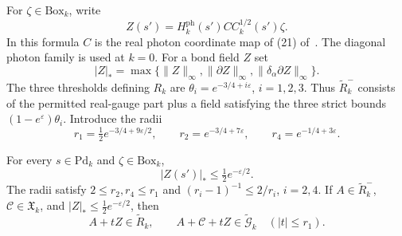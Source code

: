 \documentclass[11pt,letterpaper,reqno]{amsart}
\newcommand{\exteq}[2]{(#1) of~\cite{#2}}
\begin{document}
For $\zeta\in\mathrm{Box}_k$, write
\begin{equation}\label{eq:rgnl-weakened-photon}
 Z(s')=H_k^{\mathrm{ph}}(s')C C_k^{1/2}(s')\zeta .
\end{equation}
In this formula $C$ is the real photon coordinate map of
\exteq{21}{MaxwellBlockManuscript}. The diagonal photon
family is used at $k=0$. For a bond field $Z$ set
\[
 |Z|_*=\max\{\|Z\|_\infty,\|\partial Z\|_\infty,
                              \|\delta_\alpha\partial Z\|_\infty\}.
\]
The three thresholds defining $R_k$ are
$\theta_i=e^{-3/4+i\varepsilon}$, $i=1,2,3$.
Thus $\widetilde R_k^-$ consists of the permitted real-gauge
part plus a field satisfying the three strict bounds
$(1-e^\varepsilon)\theta_i$.
Introduce the radii
\begin{equation}\label{eq:rgnl-contour-radii}
 r_1=\tfrac12e^{-3/4+9\varepsilon/2},\qquad
 r_2=e^{-3/4+7\varepsilon},\qquad
 r_4=e^{-1/4+3\varepsilon}.
\end{equation}

\begin{proposition}\label{prop:rgnl-contour-domains}
For every $s\in\mathrm{Pd}_k$ and
$\zeta\in\mathrm{Box}_k$,
\[
 |Z(s')|_*\le\tfrac12e^{-\varepsilon/2}.
\]
The radii satisfy $2\le r_2,r_4\le r_1$ and
$(r_i-1)^{-1}\le2/r_i$, $i=2,4$.
If $A\in\widetilde R_k^-$, $\mathscr C\in\mathfrak X_k$,
and $|Z|_*\le\tfrac12e^{-\varepsilon/2}$, then
\[
 A+tZ\in\widetilde R_k,\qquad
 A+\mathscr C+tZ\in\widetilde{\mathcal G}_k
                  \quad (|t|\le r_1).
\]
\end{proposition}
\end{document}
